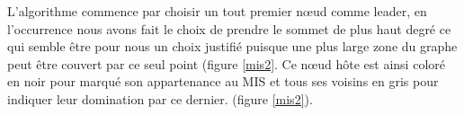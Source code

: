 \newpage
L'algorithme commence par choisir un tout premier nœud comme leader, en l'occurrence nous avons fait le choix de prendre le sommet de plus haut degré ce qui semble être pour nous un choix justifié puisque une plus large zone du graphe peut être couvert par ce seul point (figure \ref{mis2}. Ce nœud hôte est ainsi coloré en noir pour marqué son appartenance au MIS et tous ses voisins en gris pour indiquer leur domination par ce dernier.  (figure \ref{mis2}).